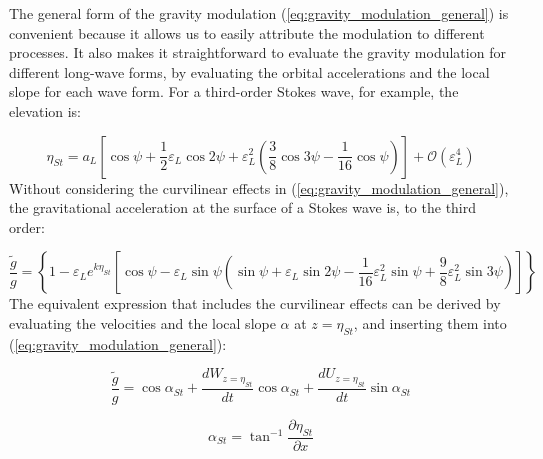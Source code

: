 \documentclass[lineno]{jfm}
\begin{document}
The general form of the gravity modulation (\ref{eq:gravity_modulation_general})
is convenient because it allows us to easily attribute the modulation to
different processes.
It also makes it straightforward to evaluate the gravity modulation for
different long-wave forms, by evaluating the orbital accelerations and the local
slope for each wave form.
For a third-order Stokes wave, for example, the elevation is:

\begin{equation}
\label{eq:eta_stokes}
\eta_{St} = a_L \left[
  \cos{\psi} +
  \dfrac{1}{2} \varepsilon_L \cos{2\psi} +
  \varepsilon_L^2 \left( \dfrac{3}{8} \cos{3\psi} - \dfrac{1}{16} \cos{\psi} \right)
\right] + \mathcal{O}(\varepsilon_L^4)
\end{equation}
Without considering the curvilinear effects in (\ref{eq:gravity_modulation_general}),
the gravitational acceleration at the surface of a Stokes wave is, to the third
order:

\begin{equation}
\label{eq:gravity_modulation_stokes}
\frac{\widetilde{g}}{g} =
\left\{
  1 - \varepsilon_L e^{k \eta_{St}}
  \left[ \cos{\psi} -
    \varepsilon_L \sin{\psi} \left(
      \sin{\psi}
      + \varepsilon_L \sin{2\psi}
      - \dfrac{1}{16} \varepsilon_L^2 \sin{\psi}
      + \dfrac{9}{8} \varepsilon_L^2 \sin{3\psi}
    \right)
  \right]
\right\}
\end{equation}
The equivalent expression that includes the curvilinear effects can be derived
by evaluating the velocities and the local slope $\alpha$ at $z = \eta_{St}$,
and inserting them into (\ref{eq:gravity_modulation_general}):

\begin{equation}
\label{eq:gravity_modulation_general_stokes}
\frac{\widetilde{g}}{g}
  = \cos{\alpha_{St}}
  + \dfrac{dW_{z=\eta_{St}}}{dt} \cos{\alpha_{St}}
  + \dfrac{dU_{z=\eta_{St}}}{dt} \sin{\alpha_{St}}
\end{equation}

\begin{equation}
\label{eq:local_slope_stokes}
\alpha_{St} = \tan^{-1}{\dfrac{\partial \eta_{St}}{\partial x}}
\end{equation}
\end{document}
